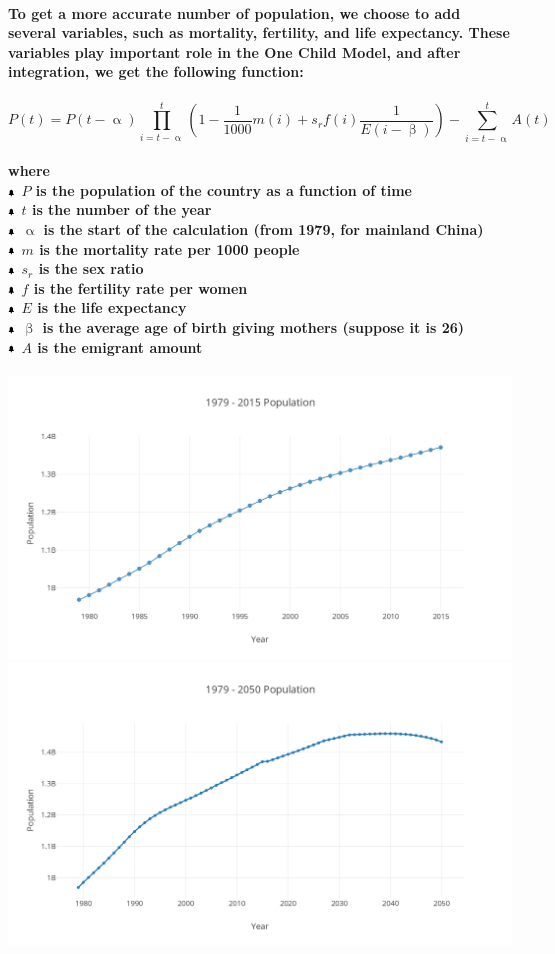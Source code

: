 \documentclass{article}
\begin{document}
\paragraph{To get a more accurate number of population, we choose to add several variables, such as mortality, fertility, and life expectancy. These variables play important role in the One Child Model, and after integration, we get the following function: }
\paragraph{$$P(t)=P(t-\upalpha)\prod_{i=t-\upalpha}^t \left(1-\frac{1}{1000}m(i)+s_rf(i)\frac{1}{E(i-\upbeta)}\right)-\sum_{i=t-\upalpha}^t A(t)$$}
\paragraph{where \\
$\bell$ $P$ is the population of the country as a function of time \\
$\bell$ $t$ is the number of the year \\
$\bell$ $\upalpha$ is the start of the calculation (from 1979, for mainland China) \\
$\bell$ $m$ is the mortality rate per 1000 people \\
$\bell$ $s_r$ is the sex ratio \\
$\bell$ $f$ is the fertility rate per women \\
$\bell$ $E$ is the life expectancy \\
$\bell$ $\upbeta$ is the average age of birth giving mothers (suppose it is 26) \\
$\bell$ $A$ is the emigrant amount \\}
\includegraphics{Population15.png}
\includegraphics{Population50.png}
\end{document}
